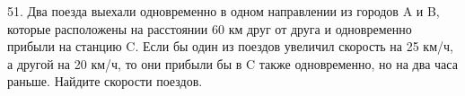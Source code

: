 51. Два поезда выехали одновременно в одном направлении из городов A и B, которые расположены на расстоянии 60 км друг от друга и одновременно прибыли на станцию C. Если бы один из поездов увеличил скорость на 25 км/ч, а другой на 20 км/ч, то они прибыли бы в C также одновременно, но на два часа раньше. Найдите скорости поездов.\\
